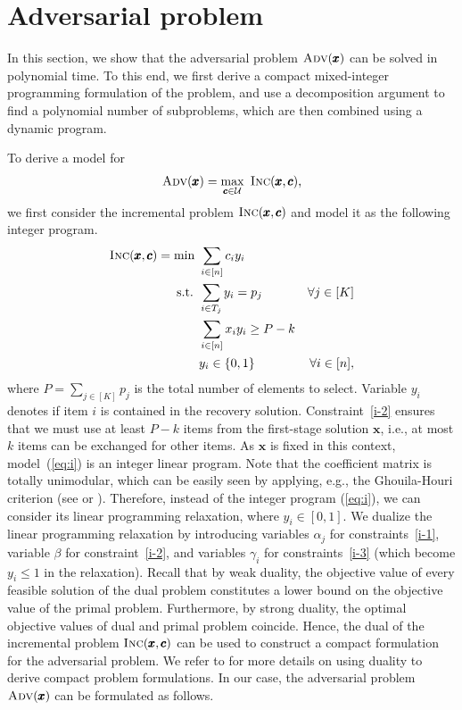 \section{Adversarial problem}
\label{sec:adv}

In this section, we show that the adversarial problem $\textsc{Adv}(\pmb{x})$ can be solved in polynomial time. To this end, we first derive a compact mixed-integer programming formulation of the problem, and use a decomposition argument to find a polynomial number of subproblems, which are then combined using a dynamic program.

To derive a model for 
\[ \textsc{Adv}(\pmb{x}) = \max_{\pmb{c}\in\cU}\ \textsc{Inc}(\pmb{x},\pmb{c}), \]
we first consider the incremental problem {$\textsc{Inc}(\pmb{x},\pmb{c})$} and model it as the following integer program.
\begin{subequations}
\label{eq:i}  
\begin{align}
\textsc{Inc}(\pmb{x},\pmb{c}) = \min\ & \sum_{i\in[n]} c_i y_i \label{i-0} \\
\text{s.t. } & \sum_{i\in T_j} y_i = p_j  & \forall j\in[K] \label{i-1}\\
& \sum_{i\in[n]} x_i y_i \ge P-k \label{i-2}\\
& y_i\in\{0,1\} & \forall i\in[n], \label{i-3}
\end{align}
\end{subequations}
where $P = \sum_{j \in [K]} p_j$ is the total number of elements to select. Variable $y_i$ denotes if item $i$ is contained in the recovery solution. Constraint~\eqref{i-2} ensures that we must use at least $P-k$ items from the first-stage solution $\pmb{x}$, i.e., at most $k$ items can be exchanged for other items. As $\pmb{x}$ is fixed in this context, model~(\ref{eq:i}) is an integer linear program. Note that the coefficient matrix is totally unimodular, which can be easily seen by applying, e.g., the Ghouila-Houri criterion (see \cite{GH62} or \cite[Theorem 5.23]{korte2006combinatorial}). Therefore, instead of the integer program (\ref{eq:i}), we can consider its linear programming relaxation, where $y_i \in [0,1]$. We dualize the linear programming relaxation by introducing variables $\alpha_j$ for constraints~\eqref{i-1}, variable $\beta$ for constraint~\eqref{i-2}, and variables $\gamma_i$ for constraints~\eqref{i-3} (which become $y_i \le 1$ in the relaxation). Recall that by weak duality, the objective value of every feasible solution of the dual problem constitutes a lower bound on the objective value of the primal problem. Furthermore, by strong duality, the optimal objective values of dual and primal problem coincide. Hence, the dual of the incremental problem $\textsc{Inc}(\pmb{x},\pmb{c})$ can be used to construct a compact formulation for the adversarial problem.  We refer to \cite{gorissen2015practical} for more details on using duality to derive compact problem formulations. In our case, the adversarial problem $\textsc{Adv}(\pmb{x})$ can be formulated as follows.
